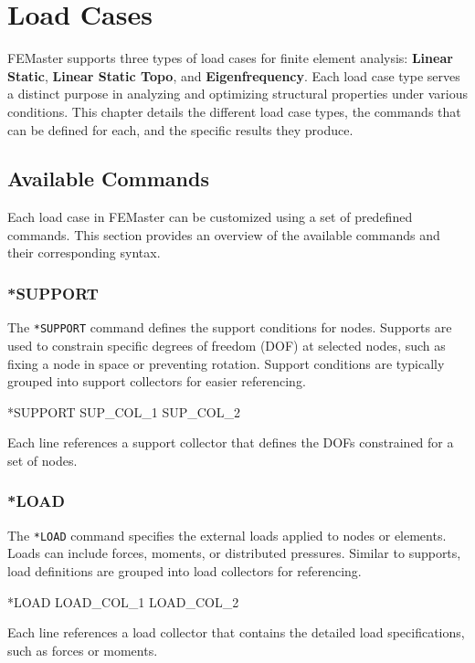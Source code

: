 \chapter{Load Cases}
\label{chap:loadcases}

FEMaster supports three types of load cases for finite element analysis: \textbf{Linear Static}, \textbf{Linear Static Topo}, and \textbf{Eigenfrequency}. Each load case type serves a distinct purpose in analyzing and optimizing structural properties under various conditions. This chapter details the different load case types, the commands that can be defined for each, and the specific results they produce.

\section{Available Commands}
Each load case in FEMaster can be customized using a set of predefined commands. This section provides an overview of the available commands and their corresponding syntax.

\subsection{*SUPPORT}
The \texttt{*SUPPORT} command defines the support conditions for nodes. Supports are used to constrain specific degrees of freedom (DOF) at selected nodes, such as fixing a node in space or preventing rotation. Support conditions are typically grouped into support collectors for easier referencing.

\begin{codeBlock}
*SUPPORT
SUP_COL_1
SUP_COL_2
\end{codeBlock}

Each line references a support collector that defines the DOFs constrained for a set of nodes.

\subsection{*LOAD}
The \texttt{*LOAD} command specifies the external loads applied to nodes or elements. Loads can include forces, moments, or distributed pressures. Similar to supports, load definitions are grouped into load collectors for referencing.

\begin{codeBlock}
*LOAD
LOAD_COL_1
LOAD_COL_2
\end{codeBlock}

Each line references a load collector that contains the detailed load specifications, such as forces or moments.

